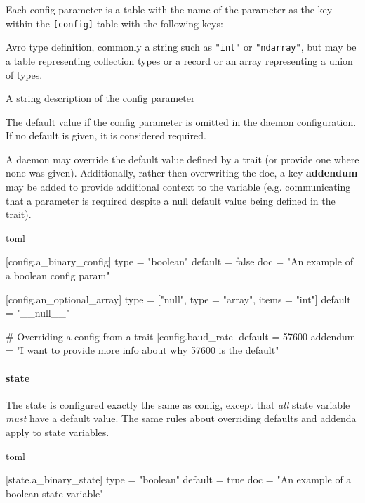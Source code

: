 Each config parameter is a table with the name of the parameter as the
key within the \texttt{{[}config{]}} table with the following keys:

\begin{description}
\tightlist
\item[\textbf{type} (required)]
Avro type definition, commonly a string such as \texttt{"int"} or
\texttt{"ndarray"}, but may be a table representing collection types or
a record or an array representing a union of types.
\item[\textbf{doc} (optional)]
A string description of the config parameter
\item[\textbf{default} (optional)]
The default value if the config parameter is omitted in the daemon
configuration. If no default is given, it is considered required.
\end{description}

A daemon may override the default value defined by a trait (or provide
one where none was given). Additionally, rather then overwriting the
doc, a key \textbf{addendum} may be added to provide additional context
to the variable (e.g. communicating that a parameter is required despite
a null default value being defined in the trait).

\begin{codefragment}{toml}\noop
[config]

[config.a_binary_config]
type = "boolean"
default = false
doc = "An example of a boolean config param"

[config.an_optional_array]
type = ["null", {type = "array", items = "int"}]
default = "__null__"

# Overriding a config from a trait
[config.baud_rate]
default = 57600
addendum = "I want to provide more info about why 57600 is the default"
\end{codefragment}

\hypertarget{state}{%
\paragraph{state}\label{state}}

The state is configured exactly the same as config, except that
\emph{all} state variable \emph{must} have a default value. The same
rules about overriding defaults and addenda apply to state variables.

\begin{codefragment}{toml}\noop
[state]

[state.a_binary_state]
type = "boolean"
default = true
doc = "An example of a boolean state variable"
\end{codefragment}

